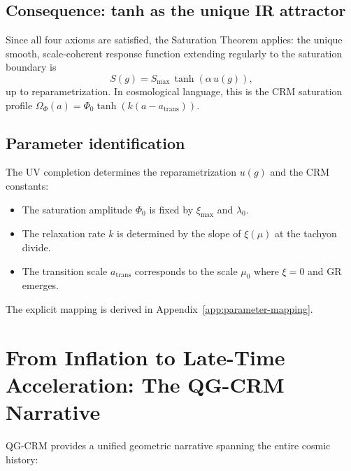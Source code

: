 \documentclass[aps,prd,twocolumn,superscriptaddress,nofootinbib]{revtex4-2}
\begin{document}
\subsection{Consequence: tanh as the unique IR attractor}

Since all four axioms are satisfied, the Saturation Theorem applies: the unique smooth, scale-coherent response function extending regularly to the saturation boundary is
\begin{equation}
S(g) = S_\mathrm{max}\,\tanh(\alpha\,u(g)),
\end{equation}
up to reparametrization. In cosmological language, this is the CRM saturation profile $\Omega_\Phi(a) = \Phi_0\tanh(k(a - a_\mathrm{trans}))$.

\subsection{Parameter identification}

The UV completion determines the reparametrization $u(g)$ and the CRM constants:
\begin{itemize}
\item The saturation amplitude $\Phi_0$ is fixed by $\xi_\mathrm{max}$ and $\lambda_0$.
\item The relaxation rate $k$ is determined by the slope of $\xi(\mu)$ at the tachyon divide.
\item The transition scale $a_\mathrm{trans}$ corresponds to the scale $\mu_0$ where $\xi = 0$ and GR emerges.
\end{itemize}

The explicit mapping is derived in Appendix~\ref{app:parameter-mapping}.


\section{From Inflation to Late-Time Acceleration: The QG-CRM Narrative}
\label{sec:narrative}

QG-CRM provides a unified geometric narrative spanning the entire cosmic history:
\end{document}

